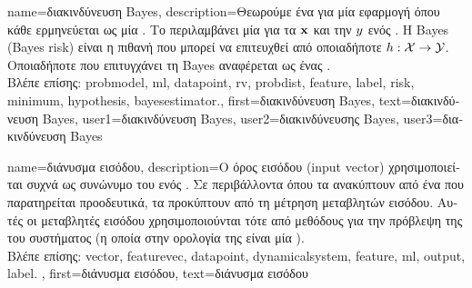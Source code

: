{name={\foreignlanguage{greek}{διακινδύνευση} Bayes},
	description={\foreignlanguage{greek}{Θεωρούμε ένα}  \foreignlanguage{greek}{για μία εφαρμογή}  
		\foreignlanguage{greek}{όπου κάθε}  \foreignlanguage{greek}{ερμηνεύεται ως μία} .
		\foreignlanguage{greek}{Το}  \foreignlanguage{greek}{περιλαμβάνει μία}  
		\foreignlanguage{greek}{για τα}  ${\bf x}$ \foreignlanguage{greek}{και την}  $y$ 
		\foreignlanguage{greek}{ενός} . 
		\foreignlanguage{greek}{Η}  Bayes (Bayes risk) 
		\foreignlanguage{greek}{είναι η}  \foreignlanguage{greek}{πιθανή}  \foreignlanguage{greek}{που 
		μπορεί να επιτευχθεί από οποιαδήποτε}  $h: \mathcal{X} \rightarrow \mathcal{Y}$. 
		\foreignlanguage{greek}{Οποιαδήποτε}  \foreignlanguage{greek}{που επιτυγχάνει τη}  
		Bayes \foreignlanguage{greek}{αναφέρεται ως ένας}  \cite{LC}.
		\\
		\foreignlanguage{greek}{Βλέπε επίσης:} \gls{probmodel}, \gls{ml}, \gls{datapoint}, \gls{rv}, \gls{probdist}, \gls{feature}, \gls{label},  \gls{risk}, 
		\gls{minimum}, \gls{hypothesis}, \gls{bayesestimator}.},
	first={\foreignlanguage{greek}{διακινδύνευση} Bayes},
	text={\foreignlanguage{greek}{διακινδύνευση} Bayes},
	user1={\foreignlanguage{greek}{διακινδύνευση} Bayes}, %
	user2={\foreignlanguage{greek}{διακινδύνευσης} Bayes}, %
	user3={\foreignlanguage{greek}{διακινδύνευση} Bayes} %
}

{name={\foreignlanguage{greek}{διάνυσμα εισόδου}},
	description={\foreignlanguage{greek}{Ο όρος}  \foreignlanguage{greek}{εισόδου} 
		(input vector) \foreignlanguage{greek}{χρησιμοποι\-εί\-ται συχνά ως συνώνυμο του}  \foreignlanguage{greek}{ενός}
		. \foreignlanguage{greek}{Σε περιβάλλοντα όπου τα}  \foreignlanguage{greek}{ανακύπτουν
		από ένα}  \foreignlanguage{greek}{που παρατηρείται προοδευτικά, τα}  
		\foreignlanguage{greek}{προκύπτουν από τη μέτρηση μεταβλητών εισόδου. Αυτές οι μεταβλητές εισόδου χρησιμοποιούνται τότε από 
		μεθόδους}   \foreignlanguage{greek}{για την πρόβλεψη της}  \foreignlanguage{greek}{του συστήματος 
		(η οποία στην ορολογία της}  \foreignlanguage{greek}{είναι μία} ).
		\\
		\foreignlanguage{greek}{Βλέπε επίσης:} \gls{vector}, \gls{featurevec}, \gls{datapoint}, \gls{dynamicalsystem}, \gls{feature}, \gls{ml}, 
		\gls{output}, \gls{label}. }, 
 	first={\foreignlanguage{greek}{διάνυσμα εισόδου}}, 
 	text={\foreignlanguage{greek}{διάνυσμα εισόδου}}
}

